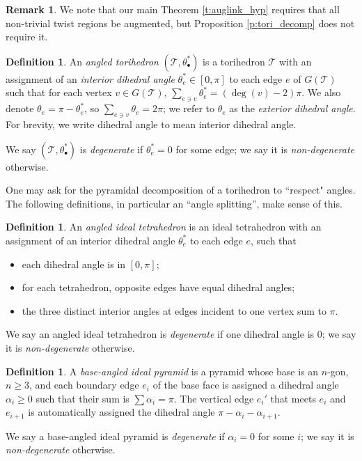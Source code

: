 \documentclass[11pt]{amsart}
\newcommand{\thmref}[1]{Theorem \ref{#1}}
\newcommand{\prpref}[1]{Proposition \ref{#1}}
\newcommand{\sT}{{\mathcal{T}}}
\theoremstyle{plain}
\theoremstyle{definition}
\newtheorem{define}[theorem]{Definition}
\newtheorem{definition}[theorem]{Definition}
\newtheorem{remark}[theorem]{Remark}
\begin{document}
\begin{remark}
We note that our main \thmref{t:auglink_hyp}
requires that all non-trivial twist regions be augmented,
but \prpref{p:tori_decomp} does not require it.
\label{r:unnecessary-augment-bigon}
\end{remark}


\begin{definition}
An \emph{angled torihedron} $(\sT, \theta_\bullet^*)$
is a torihedron $\sT$ with
an assignment of an \emph{interior dihedral angle}
$\theta_e^* \in [0,\pi]$ to each edge $e$ of $G(\sT)$
such that for each vertex $v \in G(\sT)$,
$\sum_{e \ni v} \theta_e^* = (\deg(v) - 2)\pi$.
We also denote $\theta_e = \pi - \theta_e^*$,
so $\sum_{e \ni v} \theta_e = 2\pi$;
we refer to $\theta_e$ as the \emph{exterior dihedral angle}.
For brevity, we write dihedral angle to mean 
interior dihedral angle.  


We say $(\sT, \theta_\bullet^*)$ is \emph{degenerate}
if $\theta_e^* = 0$ for some edge;
we say it is \emph{non-degenerate} otherwise.
\end{definition}


One may ask for the pyramidal decomposition of a torihedron
to ``respect" angles. The following definitions,
in particular an ``angle splitting'', make sense of this.

\begin{define}
An \emph{angled ideal tetrahedron} is an ideal tetrahedron
with an assignment of an
interior dihedral angle $\theta_e^*$ to each edge $e$, such that
\begin{itemize}
\item each dihedral angle is in $[0, \pi]$;
\item for each tetrahedron, opposite edges have equal dihedral angles;
\item the three distinct interior angles at edges incident to one vertex sum to $\pi$.
\end{itemize}

We say an angled ideal tetrahedron is \emph{degenerate} if
one dihedral angle is 0; we say it is \emph{non-degenerate} otherwise.
\end{define}


\begin{define}
A \emph{base-angled ideal pyramid}
is a pyramid whose base is an $n$-gon, $n \geq 3$,
and each boundary edge $e_i$ of the base face is assigned a dihedral angle
$\alpha_i \geq 0$ such that their sum is $\sum \alpha_i = \pi$.
The vertical edge $e_i'$ that meets $e_i$ and $e_{i+1}$
is automatically assigned the dihedral angle $\pi - \alpha_i - \alpha_{i+1}$.


We say a base-angled ideal pyramid is \emph{degenerate} if
$\alpha_i = 0$ for some $i$; we say it is \emph{non-degenerate} otherwise.
\end{define}
\end{document}
